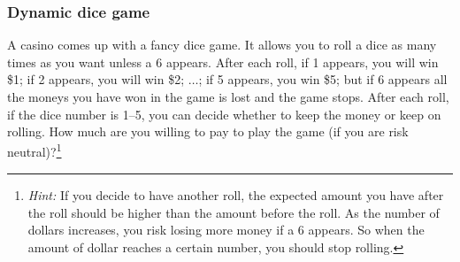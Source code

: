 
\subsubsection{Dynamic dice game}

\begin{problem}{A casino comes up with a fancy dice game. It allows you to roll a dice as many times as
you want unless a 6 appears. After each roll, if 1 appears, you will win \$1; if 2 appears,
you will win \$2; $\ldots$; if 5 appears, you win \$5; but if 6 appears all the moneys you
have won in the game is lost and the game stops. After each roll, if the dice number is 1--5,
you can decide whether to keep the money or keep on rolling. How much are you willing to pay
to play the game (if you are risk neutral)?\footnote[12]{\textit{Hint:} If you decide to have another roll, the expected amount you have after the roll should be higher than the amount before the roll. As the number of dollars increases, you risk losing more money if a 6 appears. So when the amount of dollar reaches a certain number, you should stop rolling.}}
\end{problem}

